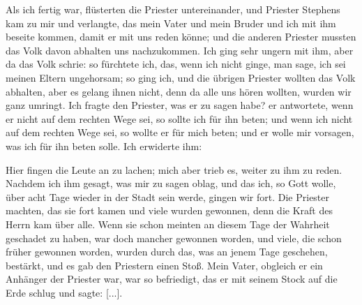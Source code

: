 Als ich fertig war, flüsterten
die Priester untereinander, und Priester Stephens kam zu mir
und verlangte, das mein Vater und mein Bruder und ich mit
ihm beseite kommen, damit er mit uns reden könne; und die
anderen Priester mussten das Volk davon abhalten uns 
nachzukommen. Ich ging sehr ungern mit ihm, aber da das Volk schrie:
 so fürchtete ich, das, wenn ich nicht
ginge, man sage, ich sei meinen Eltern ungehorsam; so ging ich,
und die übrigen Priester wollten das Volk abhalten, aber es
gelang ihnen nicht, denn da alle uns hören wollten, wurden wir
ganz umringt. Ich fragte den Priester, was er zu sagen habe?
er antwortete, wenn er nicht auf dem rechten Wege sei, so sollte
ich für ihn beten; und wenn ich nicht auf dem rechten Wege sei,
so wollte er für mich beten; und er wolle mir vorsagen, was ich
für ihn beten solle. Ich erwiderte ihm: 


Hier fingen die Leute an zu lachen; mich aber trieb
es, weiter zu ihm zu reden. Nachdem ich ihm gesagt, was
mir zu sagen oblag, und das ich, so Gott wolle, über acht Tage wieder
in der Stadt sein werde, gingen wir fort. Die Priester machten,
das sie fort kamen und viele wurden gewonnen, denn die Kraft des
Herrn kam über alle. Wenn sie schon meinten an diesem Tage
der Wahrheit geschadet zu haben, war doch mancher gewonnen
worden, und viele, die schon früher gewonnen worden, wurden durch
das, was an jenem Tage geschehen, bestärkt, und es gab den
Priestern einen Stoß. Mein Vater, obgleich er ein Anhänger der
Priester war, war so befriedigt, das er mit seinem Stock auf die
Erde schlug und sagte: 
 [...].

\section{}


